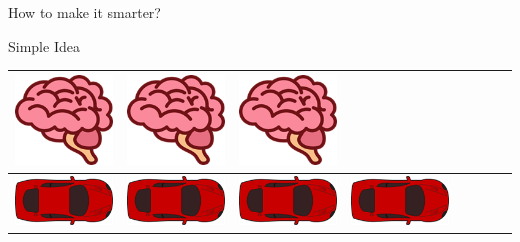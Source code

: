 \documentclass{beamer}
\begin{document}
\begin{frame}{How to make it smarter?}
\begin{exampleblock}{Simple Idea}
\begin{tabular}{c|c|c|c|c|c|c|c}
            \includegraphics[scale=0.66]{brain0.png}&
            \includegraphics[scale=0.66]{brain0.png}&
            \includegraphics[scale=0.66]{brain0.png}\\ \hline
            \includegraphics[scale=0.30]{car.png}&
            \includegraphics[scale=0.30]{car.png}&
            \includegraphics[scale=0.30]{car.png}&
            \includegraphics[scale=0.30]{car.png}&

\end{tabular}
\end{exampleblock}
\end{frame}
\end{document}
